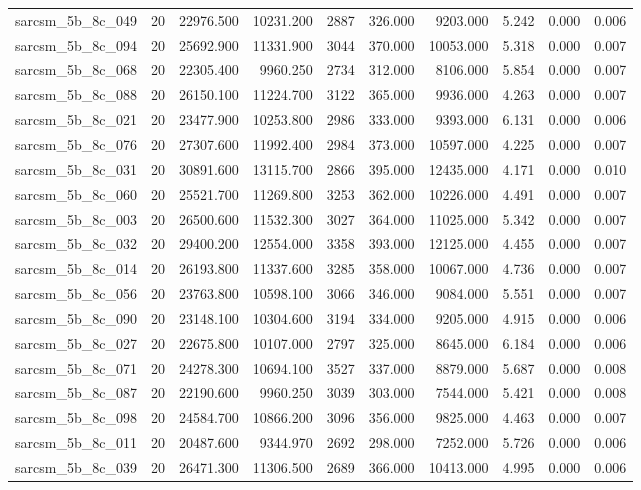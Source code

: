 \begin{tabular}{lrrrrrrrrr}
sarcsm\_5b\_8c\_049 & 20 & 22976.500 & 10231.200 & 2887 & 326.000 & 9203.000 & 5.242 & 0.000 & 0.006 \\
sarcsm\_5b\_8c\_094 & 20 & 25692.900 & 11331.900 & 3044 & 370.000 & 10053.000 & 5.318 & 0.000 & 0.007 \\
sarcsm\_5b\_8c\_068 & 20 & 22305.400 & 9960.250 & 2734 & 312.000 & 8106.000 & 5.854 & 0.000 & 0.007 \\
sarcsm\_5b\_8c\_088 & 20 & 26150.100 & 11224.700 & 3122 & 365.000 & 9936.000 & 4.263 & 0.000 & 0.007 \\
sarcsm\_5b\_8c\_021 & 20 & 23477.900 & 10253.800 & 2986 & 333.000 & 9393.000 & 6.131 & 0.000 & 0.006 \\
sarcsm\_5b\_8c\_076 & 20 & 27307.600 & 11992.400 & 2984 & 373.000 & 10597.000 & 4.225 & 0.000 & 0.007 \\
sarcsm\_5b\_8c\_031 & 20 & 30891.600 & 13115.700 & 2866 & 395.000 & 12435.000 & 4.171 & 0.000 & 0.010 \\
sarcsm\_5b\_8c\_060 & 20 & 25521.700 & 11269.800 & 3253 & 362.000 & 10226.000 & 4.491 & 0.000 & 0.007 \\
sarcsm\_5b\_8c\_003 & 20 & 26500.600 & 11532.300 & 3027 & 364.000 & 11025.000 & 5.342 & 0.000 & 0.007 \\
sarcsm\_5b\_8c\_032 & 20 & 29400.200 & 12554.000 & 3358 & 393.000 & 12125.000 & 4.455 & 0.000 & 0.007 \\
sarcsm\_5b\_8c\_014 & 20 & 26193.800 & 11337.600 & 3285 & 358.000 & 10067.000 & 4.736 & 0.000 & 0.007 \\
sarcsm\_5b\_8c\_056 & 20 & 23763.800 & 10598.100 & 3066 & 346.000 & 9084.000 & 5.551 & 0.000 & 0.007 \\
sarcsm\_5b\_8c\_090 & 20 & 23148.100 & 10304.600 & 3194 & 334.000 & 9205.000 & 4.915 & 0.000 & 0.006 \\
sarcsm\_5b\_8c\_027 & 20 & 22675.800 & 10107.000 & 2797 & 325.000 & 8645.000 & 6.184 & 0.000 & 0.006 \\
sarcsm\_5b\_8c\_071 & 20 & 24278.300 & 10694.100 & 3527 & 337.000 & 8879.000 & 5.687 & 0.000 & 0.008 \\
sarcsm\_5b\_8c\_087 & 20 & 22190.600 & 9960.250 & 3039 & 303.000 & 7544.000 & 5.421 & 0.000 & 0.008 \\
sarcsm\_5b\_8c\_098 & 20 & 24584.700 & 10866.200 & 3096 & 356.000 & 9825.000 & 4.463 & 0.000 & 0.007 \\
sarcsm\_5b\_8c\_011 & 20 & 20487.600 & 9344.970 & 2692 & 298.000 & 7252.000 & 5.726 & 0.000 & 0.006 \\
sarcsm\_5b\_8c\_039 & 20 & 26471.300 & 11306.500 & 2689 & 366.000 & 10413.000 & 4.995 & 0.000 & 0.006 \\

\end{tabular}
